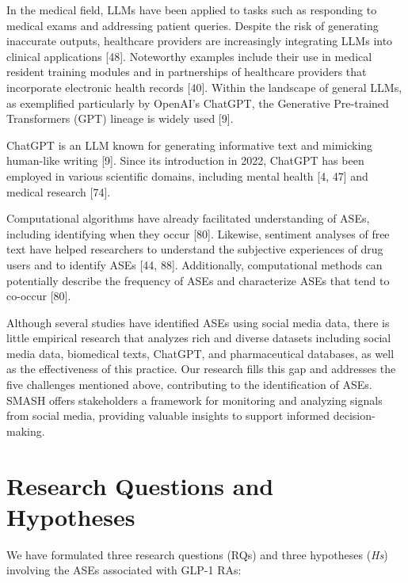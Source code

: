 \documentclass[referee,bst/sn-basic]{sn-jnl}%
\begin{document}
In the medical field, LLMs have been applied to tasks such as responding to medical exams and addressing patient queries.
Despite the risk of generating inaccurate outputs, healthcare providers are increasingly integrating LLMs into clinical applications [48]. 
Noteworthy examples include their use in medical resident training modules and in partnerships of healthcare providers that incorporate electronic health records [40]. 
Within the landscape of general LLMs, as exemplified particularly by OpenAI’s ChatGPT, the Generative Pre-trained Transformers (GPT) lineage is widely used [9]. 

ChatGPT is an LLM known for generating informative text and mimicking human-like writing [9]. 
Since its introduction in 2022, ChatGPT has been employed in various scientific domains, including mental health [4, 47] 
and medical research [74]. 

Computational algorithms have already facilitated understanding of ASEs, including identifying when they occur [80]. 
Likewise, sentiment analyses of free text have helped researchers to understand the subjective experiences of drug users and to identify ASEs [44, 88]. 
Additionally, computational methods can potentially describe the frequency of ASEs and characterize ASEs that tend to co-occur [80]. 

Although several studies have identified ASEs using social media data, there is little empirical research that analyzes rich and diverse datasets including social media data, biomedical texts, ChatGPT, and pharmaceutical databases, as well as the effectiveness of this practice. 
Our research fills this gap and addresses the five challenges mentioned above, contributing to the identification of ASEs. 
SMASH offers stakeholders a framework for monitoring and analyzing signals from social media, providing valuable insights to support informed decision-making.


\section{Research Questions and Hypotheses}
\label{sect:RQ}
We have formulated three research questions (RQs) and three hypotheses (\textit{Hs}) involving the ASEs associated with GLP-1 RAs:
\end{document}
